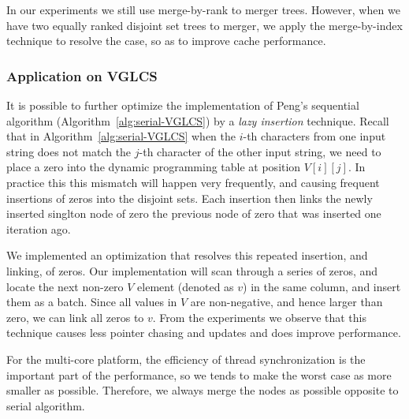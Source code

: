 In our experiments we still use merge-by-rank to merger trees.
However, when we have two equally ranked disjoint set trees to merger,
we apply the merge-by-index technique to resolve the case, so as to
improve cache performance.

\subsubsection{Application on VGLCS}


It is possible to further optimize the implementation of Peng's
sequential algorithm (Algorithm~\ref{alg:serial-VGLCS}) by a {\em lazy
  insertion} technique.  Recall that in
Algorithm~\ref{alg:serial-VGLCS} when the $i$-th characters from one
input string does not match the $j$-th character of the other input
string, we need to place a zero into the dynamic programming table at
position $V[i][j]$.  In practice this this mismatch will happen very
frequently, and causing frequent insertions of zeros into the disjoint
sets.  Each insertion then links the newly inserted singlton node of
zero the previous node of zero that was inserted one iteration ago. 

We implemented an optimization that resolves this repeated insertion,
and linking, of zeros.  Our implementation will scan through a series
of zeros, and locate the next non-zero $V$ element (denoted as $v$) in
the same column, and insert them as a batch.  Since all values in $V$
are non-negative, and hence larger than zero, we can link all zeros to
$v$.  From the experiments we observe that this technique causes less
pointer chasing and updates and does improve performance.

For the multi-core platform, the efficiency of thread synchronization is
the important part of the performance, so we tends to make the worst
case as more smaller as possible.  Therefore, we always merge the nodes
as possible opposite to serial algorithm.



\iffalse
在單一處理器下，由於動態規劃常會遇到不合定義而填入連續的 0，
多次的插入操作可以直到下一個非零的時候再進行，同時也改善查表的花費，
直到下一個非零的才進行的操作，增加嚴重增加某一次操作的時間。

在多核心平台下，要避免單一操作時間過長，一旦單一操作時間過長，
多個工作的同步將變得非常沒有效率。因此，每一次操作都強制合併，這有別於循序算法的版本。
\fi

